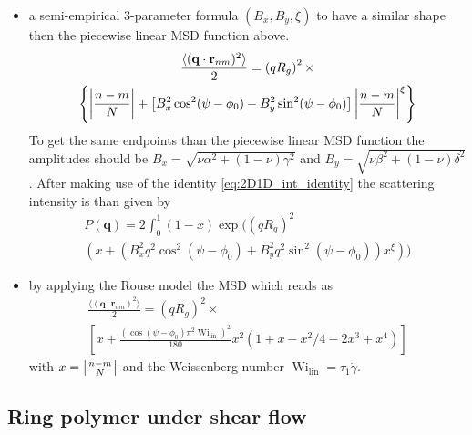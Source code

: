 \begin{itemize}
\item  a semi-empirical 3-parameter formula $(B_x,B_y,\xi)$ to have a similar shape then the piecewise linear MSD function above.
    \begin{multline}
    \frac{\langle(\mathbf{q}\cdot\mathbf{r}_{nm})^2\rangle}{2} =\left(qR_g\right)^2 \times \\
    \left\{
      \abs{\frac{n-m}{N}} + \left[B_x^2\cos^2(\psi-\phi_0)-B_y^2\sin^2(\psi-\phi_0)\right]\abs{\frac{n-m}{N}}^\xi
    \right\}
    \end{multline}
    To get the same endpoints than the piecewise linear MSD function the amplitudes should be $B_x=\sqrt{\nu\alpha^2+(1-\nu)\gamma^2}$ and $B_y=\sqrt{\nu\beta^2+(1-\nu)\delta^2}$.
    After making use of the identity \ref{eq:2D1D_int_identity} the scattering intensity is than given by
    \begin{multline}
      P(\mathbf{q}) = 2 \int_0^1 (1-x) \exp\Bigg( \left(qR_g\right)^2\\
      \left(
      x + \left(B_x^2q^2\cos^2(\psi-\phi_0)+B_y^2q^2\sin^2(\psi-\phi_0)\right)x^\xi
      \right)\Bigg)
    \end{multline}
\item by applying the Rouse model \cite{Korolkovas2019} the MSD which reads as
    \begin{multline}\label{eq:MSDlinearShearFlow}
    \frac{\langle(\mathbf{q}\cdot\mathbf{r}_{nm})^2\rangle}{2} = \left(qR_g\right)^2 \times \\ \left[ x+\frac{\left(\cos(\psi-\phi_0)\pi^2\operatorname{Wi}_\mathrm{lin}\right)^2}{180} x^2\left(1+x-x^2/4-2x^3+x^4\right) \right]
    \end{multline}
    with $x=\abs{\frac{n-m}{N}}$ and the Weissenberg number $\operatorname{Wi}_\mathrm{lin}=\tau_1\dot{\gamma}$.
\end{itemize}

\subsection{Ring polymer under shear flow}~\\
\label{sect:RingPolymerShearFlow}

